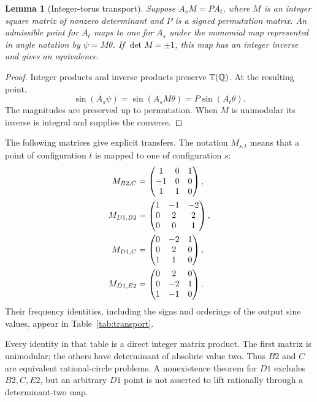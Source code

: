 \documentclass[11pt,letterpaper]{article}
\newtheorem{lemma}[theorem]{Lemma}
\theoremstyle{definition}\newtheorem{definition}[theorem]{Definition}
\theoremstyle{remark}\newtheorem{remark}[theorem]{Remark}
\newcommand{\Q}{\mathbb Q}\newcommand{\Z}{\mathbb Z}\newcommand{\R}{\mathbb R}
\begin{document}
\begin{lemma}[Integer-torus transport]\label{lem:transport}
Suppose $A_sM=PA_t$, where $M$ is an integer square matrix of nonzero determinant and $P$ is a signed permutation matrix. An admissible point for $A_t$ maps to one for $A_s$ under the monomial map represented in angle notation by $\psi=M\theta$. If $\det M=\pm1$, this map has an integer inverse and gives an equivalence.
\end{lemma}
\begin{proof}
Integer products and inverse products preserve $\T(\Q)$. At the resulting point,
\[
 \sin(A_s\psi)=\sin(A_sM\theta)=P\sin(A_t\theta).
\]
The magnitudes are preserved up to permutation. When $M$ is unimodular its inverse is integral and supplies the converse.
\end{proof}

The following matrices give explicit transfers. The notation $M_{s,t}$ means that a point of configuration $t$ is mapped to one of configuration $s$:
\begin{align}
 M_{B2,C}&=\begin{pmatrix}1&0&1\\-1&0&0\\1&1&0\end{pmatrix},\notag\\
 M_{D1,B2}&=\begin{pmatrix}1&-1&-2\\0&2&2\\0&0&1\end{pmatrix},\label{eq:maps}\\
 M_{D1,C}&=\begin{pmatrix}0&-2&1\\0&2&0\\1&1&0\end{pmatrix},\notag\\
 M_{D1,E2}&=\begin{pmatrix}0&2&0\\0&-2&1\\1&-1&0\end{pmatrix}.\notag
\end{align}
Their frequency identities, including the signs and orderings of the output sine values, appear in Table~\ref{tab:transport}.


Every identity in that table is a direct integer matrix product. The first matrix is unimodular; the others have determinant of absolute value two. Thus $B2$ and $C$ are equivalent rational-circle problems. A nonexistence theorem for $D1$ excludes $B2,C,E2$, but an arbitrary $D1$ point is not asserted to lift rationally through a determinant-two map.
\end{document}
